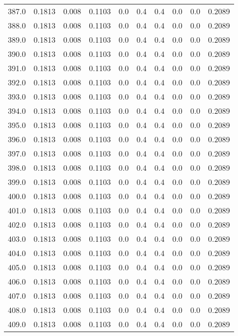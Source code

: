 \begin{longtable}{lrrrrrrrrr}
387.0 & 0.1813 & 0.008 & 0.1103 & 0.0 & 0.4 & 0.4 & 0.0 & 0.0 & 0.2089 \\
388.0 & 0.1813 & 0.008 & 0.1103 & 0.0 & 0.4 & 0.4 & 0.0 & 0.0 & 0.2089 \\
389.0 & 0.1813 & 0.008 & 0.1103 & 0.0 & 0.4 & 0.4 & 0.0 & 0.0 & 0.2089 \\
390.0 & 0.1813 & 0.008 & 0.1103 & 0.0 & 0.4 & 0.4 & 0.0 & 0.0 & 0.2089 \\
391.0 & 0.1813 & 0.008 & 0.1103 & 0.0 & 0.4 & 0.4 & 0.0 & 0.0 & 0.2089 \\
392.0 & 0.1813 & 0.008 & 0.1103 & 0.0 & 0.4 & 0.4 & 0.0 & 0.0 & 0.2089 \\
393.0 & 0.1813 & 0.008 & 0.1103 & 0.0 & 0.4 & 0.4 & 0.0 & 0.0 & 0.2089 \\
394.0 & 0.1813 & 0.008 & 0.1103 & 0.0 & 0.4 & 0.4 & 0.0 & 0.0 & 0.2089 \\
395.0 & 0.1813 & 0.008 & 0.1103 & 0.0 & 0.4 & 0.4 & 0.0 & 0.0 & 0.2089 \\
396.0 & 0.1813 & 0.008 & 0.1103 & 0.0 & 0.4 & 0.4 & 0.0 & 0.0 & 0.2089 \\
397.0 & 0.1813 & 0.008 & 0.1103 & 0.0 & 0.4 & 0.4 & 0.0 & 0.0 & 0.2089 \\
398.0 & 0.1813 & 0.008 & 0.1103 & 0.0 & 0.4 & 0.4 & 0.0 & 0.0 & 0.2089 \\
399.0 & 0.1813 & 0.008 & 0.1103 & 0.0 & 0.4 & 0.4 & 0.0 & 0.0 & 0.2089 \\
400.0 & 0.1813 & 0.008 & 0.1103 & 0.0 & 0.4 & 0.4 & 0.0 & 0.0 & 0.2089 \\
401.0 & 0.1813 & 0.008 & 0.1103 & 0.0 & 0.4 & 0.4 & 0.0 & 0.0 & 0.2089 \\
402.0 & 0.1813 & 0.008 & 0.1103 & 0.0 & 0.4 & 0.4 & 0.0 & 0.0 & 0.2089 \\
403.0 & 0.1813 & 0.008 & 0.1103 & 0.0 & 0.4 & 0.4 & 0.0 & 0.0 & 0.2089 \\
404.0 & 0.1813 & 0.008 & 0.1103 & 0.0 & 0.4 & 0.4 & 0.0 & 0.0 & 0.2089 \\
405.0 & 0.1813 & 0.008 & 0.1103 & 0.0 & 0.4 & 0.4 & 0.0 & 0.0 & 0.2089 \\
406.0 & 0.1813 & 0.008 & 0.1103 & 0.0 & 0.4 & 0.4 & 0.0 & 0.0 & 0.2089 \\
407.0 & 0.1813 & 0.008 & 0.1103 & 0.0 & 0.4 & 0.4 & 0.0 & 0.0 & 0.2089 \\
408.0 & 0.1813 & 0.008 & 0.1103 & 0.0 & 0.4 & 0.4 & 0.0 & 0.0 & 0.2089 \\
409.0 & 0.1813 & 0.008 & 0.1103 & 0.0 & 0.4 & 0.4 & 0.0 & 0.0 & 0.2089 \\

\end{longtable}
